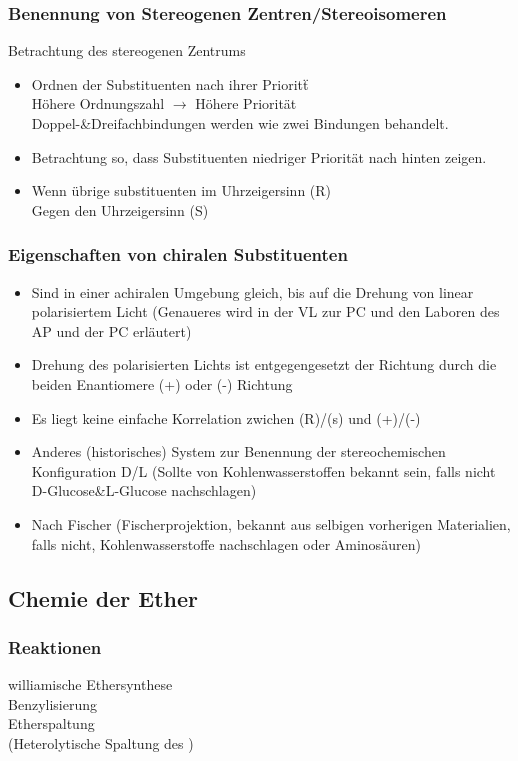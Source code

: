 \documentclass[a4paper, fleqn]{article}
\begin{document}
\subsubsection*{Benennung von Stereogenen Zentren/Stereoisomeren}
Betrachtung des stereogenen Zentrums\\
\begin{itemize}
  \item Ordnen der Substituenten nach ihrer Priorit\"t\\H\"ohere Ordnungszahl $\rightarrow$ H\"ohere Priorit\"at\\Doppel-\&Dreifachbindungen werden wie zwei Bindungen behandelt.
  \item Betrachtung so, dass Substituenten niedriger Priorit\"at nach hinten zeigen.
  \item Wenn \"ubrige substituenten im Uhrzeigersinn (R)\\ Gegen den Uhrzeigersinn (S)
\end{itemize}

\subsubsection*{Eigenschaften von chiralen Substituenten}
\begin{itemize}
  \item Sind in einer achiralen Umgebung gleich, bis auf die Drehung von linear polarisiertem Licht (Genaueres wird in der VL zur PC und den Laboren des AP und der PC erl\"autert)
  \item Drehung des polarisierten Lichts ist entgegengesetzt der Richtung durch die beiden Enantiomere (+) oder (-) Richtung
  \item Es liegt keine einfache Korrelation zwichen (R)/(s) und (+)/(-)
  \item Anderes (historisches) System zur Benennung der stereochemischen Konfiguration D/L (Sollte von Kohlenwasserstoffen bekannt sein, falls nicht D-Glucose\&L-Glucose nachschlagen)
  \item Nach Fischer (Fischerprojektion, bekannt aus selbigen vorherigen Materialien, falls nicht, Kohlenwasserstoffe nachschlagen oder Aminos\"auren)
\end{itemize}

\subsection{Chemie der Ether}
\subsubsection{Reaktionen}
williamische Ethersynthese\\
Benzylisierung\\
Etherspaltung\\
 (Heterolytische Spaltung des )\\
\end{document}
